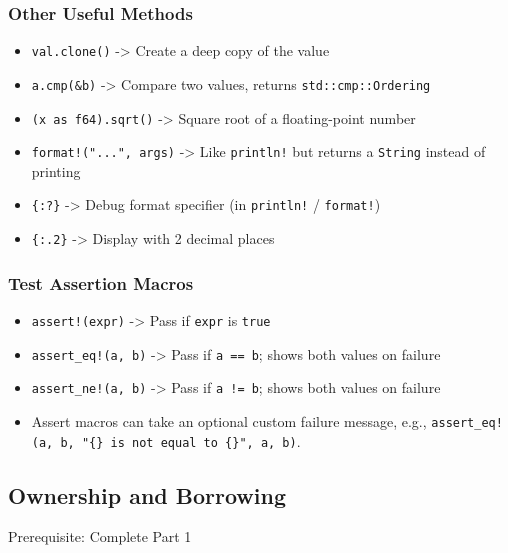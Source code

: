 \documentclass[
  11pt,
]{article}
\providecommand{\tightlist}{%
  \setlength{\itemsep}{0pt}\setlength{\parskip}{0pt}}
\begin{document}
\subsubsection{Other Useful Methods}\label{other-useful-methods}

\begin{itemize}
\tightlist
\item
  \texttt{val.clone()} -\textgreater{} Create a deep copy of the value
\item
  \texttt{a.cmp(\&b)} -\textgreater{} Compare two values, returns
  \texttt{std::cmp::Ordering}
\item
  \texttt{(x\ as\ f64).sqrt()} -\textgreater{} Square root of a
  floating-point number
\item
  \texttt{format!("...",\ args)} -\textgreater{} Like \texttt{println!}
  but returns a \texttt{String} instead of printing
\item
  \texttt{\{:?\}} -\textgreater{} Debug format specifier (in
  \texttt{println!} / \texttt{format!})
\item
  \texttt{\{:.2\}} -\textgreater{} Display with 2 decimal places
\end{itemize}

\subsubsection{Test Assertion Macros}\label{test-assertion-macros}

\begin{itemize}
\tightlist
\item
  \texttt{assert!(expr)} -\textgreater{} Pass if \texttt{expr} is
  \texttt{true}
\item
  \texttt{assert\_eq!(a,\ b)} -\textgreater{} Pass if \texttt{a\ ==\ b};
  shows both values on failure
\item
  \texttt{assert\_ne!(a,\ b)} -\textgreater{} Pass if \texttt{a\ !=\ b};
  shows both values on failure
\item
  Assert macros can take an optional custom failure message, e.g.,
  \texttt{assert\_eq!(a,\ b,\ "\{\}\ is\ not\ equal\ to\ \{\}",\ a,\ b)}.
\end{itemize}

\subsection{Ownership and Borrowing}\label{ownership-and-borrowing}

Prerequisite: Complete Part 1
\end{document}
